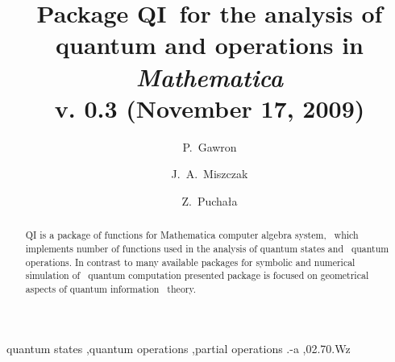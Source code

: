 \documentclass[final,5p,times]{elsarticle}
\newcommand{\Mathematica}{\emph{Mathematica}}
\newcommand{\1}{{\rm 1\hspace{-0.9mm}l}}
\newcommand{\qi}{QI}
\begin{document}
\begin{frontmatter}



\title{Package \qi\ for the analysis of quantum and operations in \Mathematica\\[6pt] \small{v. 0.3 (November 17, 2009)}}


\author{P.~Gawron}
\author{J.~A.~Miszczak}
\author{Z.~Pucha{\l}a}
\address{Institute of Theoretical and Applied Informatics, Polish Academy of 
Sciences, Ba{\l}tycka 5, 44-100 Gliwice, Poland}

\begin{abstract}
QI is a package of functions for Mathematica computer algebra system, \ which
implements number of functions used in the analysis of quantum states and \
quantum operations. In contrast to many available packages for symbolic and
numerical simulation of \ quantum computation presented package is focused on
geometrical aspects of quantum information \ theory.

\end{abstract}

\begin{keyword}
quantum states \sep quantum operations \sep partial operations
.-a \sep 02.70.Wz


\end{keyword}

\end{frontmatter}
\end{document}
